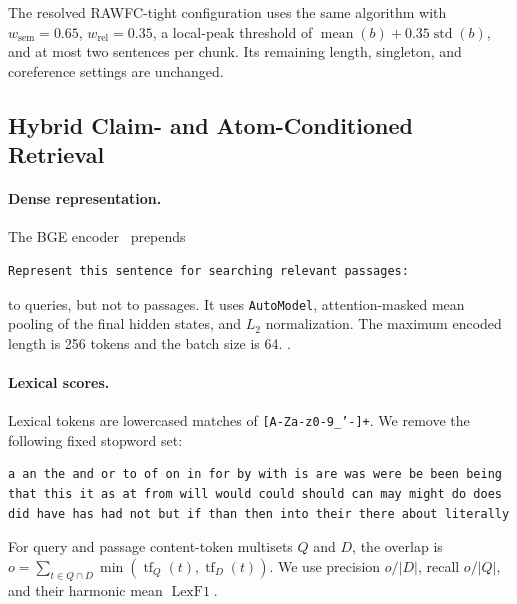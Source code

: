 The resolved RAWFC-tight configuration uses the same algorithm with
\(w_{\mathrm{sem}}=0.65\), \(w_{\mathrm{rel}}=0.35\), a local-peak
threshold of \(\operatorname{mean}(b)+0.35\operatorname{std}(b)\), and at
most two sentences per chunk.  Its remaining length, singleton, and
coreference settings are unchanged.

\subsection{Hybrid Claim- and Atom-Conditioned Retrieval}
\label{supp:retrieval}

\paragraph{Dense representation.}
The BGE encoder~\citep{Xiao2023BGE} prepends
\begin{lstlisting}
Represent this sentence for searching relevant passages:
\end{lstlisting}
to queries, but not to passages.  It uses \texttt{AutoModel}, attention-masked
mean pooling of the final hidden states, and \(L_2\) normalization.  The
maximum encoded length is 256 tokens and the batch size is 64.
.

\paragraph{Lexical scores.}
Lexical tokens are lowercased matches of
\texttt{[A-Za-z0-9\_'-]+}.  We remove the following fixed stopword set:
\begin{lstlisting}
a an the and or to of on in for by with is are was were be been being
that this it as at from will would could should can may might do does
did have has had not but if than then into their there about literally
\end{lstlisting}
For query and passage content-token multisets \(Q\) and \(D\), the overlap is
\(o=\sum_{t\in Q\cap D}\min(\operatorname{tf}_Q(t),
\operatorname{tf}_D(t))\).  We use precision \(o/|D|\), recall \(o/|Q|\), and
their harmonic mean \(\operatorname{LexF1}\).

